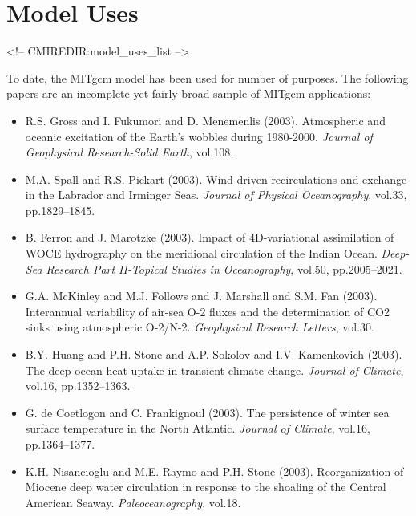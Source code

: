 
\chapter{Model Uses}
\begin{rawhtml}
<!-- CMIREDIR:model_uses_list -->
\end{rawhtml}



To date, the MITgcm model has been used for number of purposes.  The
following papers are an incomplete yet fairly broad sample of MITgcm
applications:

\begin{itemize}

\item R.S. Gross and I. Fukumori and D. Menemenlis (2003).
Atmospheric and oceanic excitation of the Earth's wobbles during 1980-2000.
{\it Journal of Geophysical Research-Solid Earth}, vol.108.

\item M.A. Spall and R.S. Pickart (2003).
Wind-driven recirculations and exchange in the Labrador and Irminger Seas. 
{\it Journal of Physical Oceanography}, vol.33, pp.1829--1845. 

\item B. Ferron and J. Marotzke (2003).
Impact of 4D-variational assimilation of WOCE hydrography on the
meridional circulation of the Indian Ocean. {\it Deep-Sea Research Part
II-Topical Studies in Oceanography}, vol.50, pp.2005--2021.

\item G.A. McKinley and M.J. Follows and J. Marshall and S.M. Fan (2003).
Interannual variability of air-sea O-2 fluxes and the determination of
CO2 sinks using atmospheric O-2/N-2. {\it Geophysical Research Letters},
vol.30. 

\item B.Y. Huang and P.H. Stone and A.P. Sokolov and I.V. Kamenkovich
(2003). The deep-ocean heat uptake in transient climate change. {\it Journal
of Climate}, vol.16, pp.1352--1363. 

\item G. de Coetlogon and C. Frankignoul (2003). The persistence of winter
sea surface temperature in the North Atlantic. {\it Journal of Climate},
vol.16, pp.1364--1377. 

\item K.H. Nisancioglu and M.E. Raymo and P.H. Stone (2003).
Reorganization of Miocene deep water circulation in response to the
shoaling of the Central American Seaway. {\it Paleoceanography}, vol.18. 


\end{itemize}

